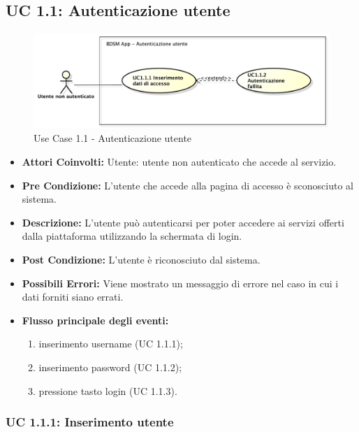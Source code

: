\subsection{UC 1.1: Autenticazione utente}

\begin{figure}[htbp]
    \centering
    \centerline{\includegraphics[scale=0.5]{./images/UC1_1.pdf}}
    \caption{Use Case 1.1 - Autenticazione utente}
\end{figure}


\begin{itemize}
    \item \textbf{Attori Coinvolti:}
    Utente: utente non autenticato che accede al servizio.
    \item \textbf{Pre Condizione:}
    L'utente che accede alla pagina di accesso è sconosciuto al sistema.
    \item \textbf{Descrizione:}
    L'utente può autenticarsi per poter accedere ai servizi offerti dalla piattaforma utilizzando la schermata di login.
    \item \textbf{Post Condizione:}
    L'utente è riconosciuto dal sistema.
    \item \textbf{Possibili Errori:}
    Viene mostrato un messaggio di errore nel caso in cui i dati forniti siano errati.
    \item \textbf{Flusso principale degli eventi:}

    \begin{enumerate}
        \item inserimento username (UC 1.1.1);
        \item inserimento password (UC 1.1.2);
        \item pressione tasto login (UC 1.1.3).
    \end{enumerate}

\end{itemize}

\subsubsection{UC 1.1.1: Inserimento utente}


